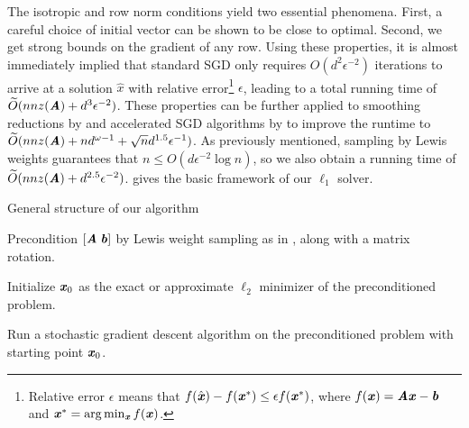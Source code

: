 The isotropic and row norm conditions yield two essential phenomena. First, a careful choice of initial vector can be shown to be close to optimal. Second, we get strong bounds on the gradient of any row. Using these properties, it is almost immediately implied that standard SGD only requires $O(d^2\epsilon^{-2})$ iterations to arrive at a solution $\hat{x}$  with relative error\footnote{Relative error $\epsilon$ means that $f(\hat{\boldsymbol{\mathit{x}}}) - f(\boldsymbol{\mathit{x}}^*) \le \epsilon f(\boldsymbol{\mathit{x}}^*)$, where $f(\boldsymbol{\mathit{x}}) = \boldsymbol{\mathit{A}} \boldsymbol{\mathit{x}} - \boldsymbol{\mathit{b}}$ and $\boldsymbol{\mathit{x}}^* = \arg\min_{\boldsymbol{\mathit{x}}} f(\boldsymbol{\mathit{x}})$.} $\epsilon$, leading to a total running time of $\widetilde{O}(nnz(\boldsymbol{\mathit{A}}) + d^3 \epsilon^{-2})$.
These properties can be further applied to smoothing reductions by \cite{AllenZhuH16} and accelerated SGD
algorithms by \cite{AllenZhu17} to improve the runtime to
$\widetilde{O}(nnz(\boldsymbol{\mathit{A}}) + nd^{\omega - 1} + \sqrt{n}d^{1.5} \epsilon^{-1})$. As previously mentioned, sampling by Lewis weights guarantees that $n \le O(d\epsilon^{-2}\log{n})$, so we also obtain a running time of $\widetilde{O}(nnz(\boldsymbol{\mathit{A}}) + d^{2.5} \epsilon^{-2})$.
 gives the basic framework of our $\ell_1$ solver.

\begin{algorithm2e}[h]
	\caption{General structure of our algorithm \label{fig:mainAlgo}}
	\begin{enumerate*}
		\item Precondition $[\boldsymbol{\mathit{A}}\;\boldsymbol{\mathit{b}}]$ by Lewis weight sampling as in \cite{cohenpeng}, along with a matrix rotation.
		\item Initialize $\boldsymbol{\mathit{x}}_0$ as the exact or approximate  $\ell_2$ minimizer of the preconditioned problem.
		\item Run a stochastic gradient descent algorithm on the preconditioned problem with starting point $\boldsymbol{\mathit{x}}_0$.
	\end{enumerate*}
\end{algorithm2e}

